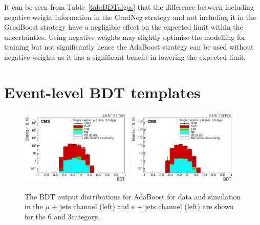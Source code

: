 It can be seen from Table~\ref{tab:BDTalgos} that the difference between including negative weight information in the GradNeg strategy and not including it in the GradBoost strategy have a negligible effect on the expected limit within the uncertainties. Using negative weights may slightly optimise the modelling for training but not significantly hence the AdaBoost strategy can be used without negative weights as it has a significant benefit in lowering the expected limit.


\section{Event-level BDT templates \label{app:BDTtemp}}


\begin{figure}[ht!]
    \includegraphics[width=0.48\textwidth]{images/Run2/BDT_Mu29Aug400trees_5MinNodeSize_20nCuts_3MaxDepth_5adaboostbeta_adaBoost_alphaSTune_noMinEvents6nJets3nMtags_StackLogY.pdf}
    \includegraphics[width=0.48\textwidth]{images/Run2/BDT_El29Aug400trees_5MinNodeSize_20nCuts_3MaxDepth_5adaboostbeta_adaBoost_alphaSTune_noMinEvents6nJets3nMtags_StackLogY.pdf} 
    \caption{The BDT output distributions for AdaBoost for data and simulation in the $\mu$ + jets channel (left) and e + jets channel (left) are shown for the 6 \njets and 3\nMtags category.}
    \label{fig:BDT_Mu29Aug400trees_5MinNodeSize_20nCuts_3MaxDepth_5adaboostbeta_adaBoost_alphaSTune_noMinEvents63}
\end{figure}


